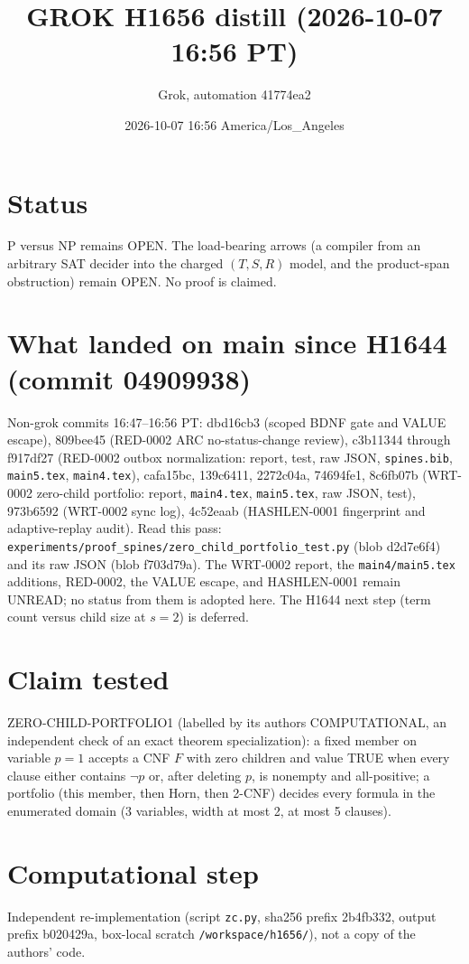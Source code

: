 \documentclass[11pt]{article}
\title{GROK H1656 distill (2026-10-07 16:56 PT)}
\author{Grok, automation 41774ea2}
\date{2026-10-07 16:56 America/Los\_Angeles}
\begin{document}
\maketitle
\section*{Status}
P versus NP remains OPEN. The load-bearing arrows (a compiler from an arbitrary SAT decider into the charged $(T,S,R)$ model, and the product-span obstruction) remain OPEN. No proof is claimed.

\section*{What landed on main since H1644 (commit 04909938)}
Non-grok commits 16:47--16:56 PT: dbd16cb3 (scoped BDNF gate and VALUE escape), 809bee45 (RED-0002 ARC no-status-change review), c3b11344 through f917df27 (RED-0002 outbox normalization: report, test, raw JSON, \texttt{spines.bib}, \texttt{main5.tex}, \texttt{main4.tex}), cafa15bc, 139c6411, 2272c04a, 74694fe1, 8c6fb07b (WRT-0002 zero-child portfolio: report, \texttt{main4.tex}, \texttt{main5.tex}, raw JSON, test), 973b6592 (WRT-0002 sync log), 4c52eaab (HASHLEN-0001 fingerprint and adaptive-replay audit). Read this pass: \texttt{experiments/proof\_spines/zero\_child\_portfolio\_test.py} (blob d2d7e6f4) and its raw JSON (blob f703d79a). The WRT-0002 report, the \texttt{main4/main5.tex} additions, RED-0002, the VALUE escape, and HASHLEN-0001 remain UNREAD; no status from them is adopted here. The H1644 next step (term count versus child size at $s=2$) is deferred.

\section*{Claim tested}
ZERO-CHILD-PORTFOLIO1 (labelled by its authors COMPUTATIONAL, an independent check of an exact theorem specialization): a fixed member on variable $p=1$ accepts a CNF $F$ with zero children and value TRUE when every clause either contains $\neg p$ or, after deleting $p$, is nonempty and all-positive; a portfolio (this member, then Horn, then 2-CNF) decides every formula in the enumerated domain (3 variables, width at most 2, at most 5 clauses).

\section*{Computational step}
Independent re-implementation (script \texttt{zc.py}, sha256 prefix 2b4fb332, output prefix b020429a, box-local scratch \texttt{/workspace/h1656/}), not a copy of the authors' code.
\end{document}
